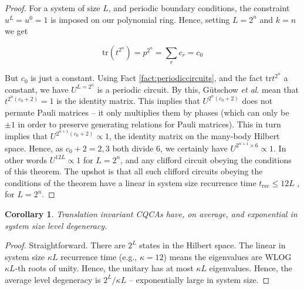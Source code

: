 \documentclass[aps,prb,twocolumn,superscriptaddress]{revtex4-1}
\newtheorem{corollary}{Corollary}[theorem]
\begin{document}
\begin{proof}
For a system of size $L$, and periodic boundary conditions, the constraint
$u^{L}=u^{0}=1$ is imposed on our polynomial ring. Hence, setting
$L=2^{n}$ and $k=n$ we get

\[
\text{tr}\left(t^{2^{n}}\right)=p^{2^{n}}=\sum_{r}c_{r}=c_{0}
\]


But $c_{0}$ is just a constant. Using Fact \ref{fact:periodiccircuits},
and the fact $\text{tr}t^{2^{n}}$ a constant, we have $U^{L=2^{n}}$
is a periodic circuit. By this, G{\"u}tschow \textit{et al}. mean that $t^{2^{n}(c_{0}+2)}=\text{1}$ is
the identity matrix. This implies that $U^{2^{n}(c_{0}+2)}$ does
not permute Pauli matrices -- it only multiplies them by phases (which
can only be $\pm1$ in order to preserve generating relations for
Pauli matrices). This in turn implies that $U^{2^{n+1}(c_{0}+2)}\propto1$,
the identity matrix on the many-body Hilbert space. Hence, as $c_{0}+2=2,3$
both divide $6$, we certainly have $U^{2^{n+1}\times6}\propto1$.
In other words $U^{12L}\propto1$ for $L=2^{n}$, and any clifford
circuit obeying the conditions of this theorem. The upshot is that
all such clifford circuits obeying the conditions of the theorem have
a linear in system size recurrence time $t_{\text{rec}}\leq 12 L$ , for $L=2^{n}$.\end{proof}
\begin{corollary}
Translation invariant CQCAs have, on average, and exponential in system
size level degeneracy. \end{corollary}
\begin{proof}
Straightforward. There are $2^{L}$ states in the Hilbert space. The
linear in system size $\kappa L$ recurrence time (e.g., $\kappa=12$) means the eigenvalues
are WLOG $\kappa L$-th roots of unity. Hence, the unitary has at
most $\kappa L$ eigenvalues. Hence, the average level degeneracy
is $2^{L}/\kappa L$ -- exponentially large in system size. 
\end{proof}


\end{document}
